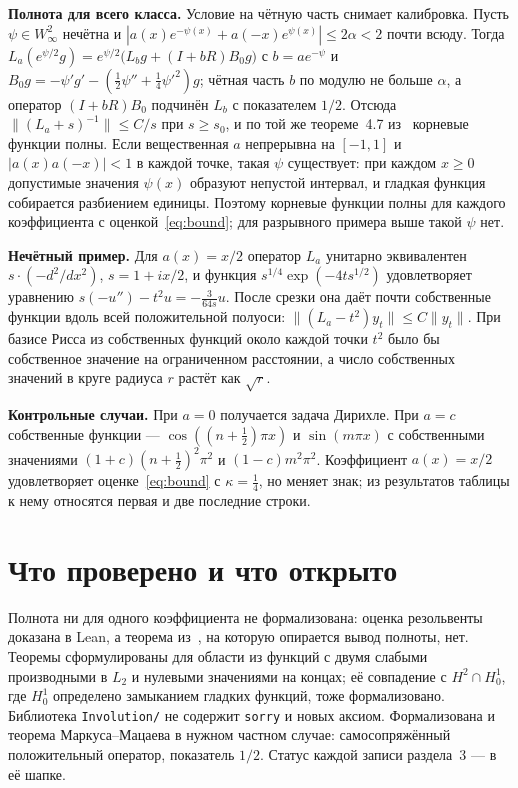 \documentclass[12pt,a4paper]{article}
\begin{document}
\textbf{Полнота для всего класса.} Условие на чётную часть снимает калибровка. Пусть
$\psi\in W^2_\infty$ нечётна и $|a(x)e^{-\psi(x)}+a(-x)e^{\psi(x)}|\le2\alpha<2$ почти
всюду. Тогда $L_a(e^{\psi/2}g)=e^{\psi/2}\bigl(L_bg+(I+bR)B_0g\bigr)$ с $b=ae^{-\psi}$ и
$B_0g=-\psi'g'-(\tfrac12\psi''+\tfrac14\psi'^2)g$; чётная часть $b$ по модулю не больше
$\alpha$, а оператор $(I+bR)B_0$ подчинён $L_b$ с показателем $1/2$. Отсюда
$\|(L_a+s)^{-1}\|\le C/s$ при $s\ge s_0$, и по той же теореме~4.7 из~\cite{S3} корневые
функции полны. Если вещественная $a$ непрерывна на $[-1,1]$ и $|a(x)a(-x)|<1$ в каждой
точке, такая $\psi$ существует: при каждом $x\ge0$ допустимые значения $\psi(x)$ образуют
непустой интервал, и гладкая функция собирается разбиением единицы. Поэтому корневые
функции полны для каждого коэффициента с оценкой~\eqref{eq:bound}; для разрывного
примера выше такой $\psi$ нет.

\textbf{Нечётный пример.} Для $a(x)=x/2$ оператор $L_a$ унитарно эквивалентен
$s\cdot(-d^2/dx^2)$, $s=1+ix/2$, и функция $s^{1/4}\exp(-4ts^{1/2})$ удовлетворяет
уравнению $s(-u'')-t^2u=-\tfrac3{64s}u$. После срезки она даёт почти собственные функции
вдоль всей положительной полуоси: $\|(L_a-t^2)y_t\|\le C\|y_t\|$. При базисе Рисса из
собственных функций около каждой точки $t^2$ было бы собственное значение на ограниченном
расстоянии, а число собственных значений в круге радиуса $r$ растёт как $\sqrt r$.

\textbf{Контрольные случаи.} При $a=0$ получается задача Дирихле. При $a=c$ собственные
функции --- $\cos((n+\tfrac12)\pi x)$ и $\sin(m\pi x)$ с собственными значениями
$(1+c)(n+\tfrac12)^2\pi^2$ и $(1-c)m^2\pi^2$. Коэффициент $a(x)=x/2$ удовлетворяет
оценке~\eqref{eq:bound} с $\kappa=\tfrac14$, но меняет знак; из результатов таблицы к
нему относятся первая и две последние строки.

\section{Что проверено и что открыто}


Полнота ни для одного коэффициента не формализована: оценка резольвенты доказана в
Lean, а теорема из~\cite{S3}, на которую опирается вывод полноты, нет. Теоремы
сформулированы для области из функций с двумя слабыми производными в $L_2$ и нулевыми
значениями на концах; её совпадение с $H^2\cap H_0^1$, где $H_0^1$ определено замыканием
гладких функций, тоже формализовано. Библиотека \texttt{Involution/} не содержит
\texttt{sorry} и новых аксиом. Формализована и теорема Маркуса--Мацаева в нужном частном
случае: самосопряжённый положительный оператор, показатель $1/2$. Статус каждой записи
раздела~3 --- в её шапке.
\end{document}
